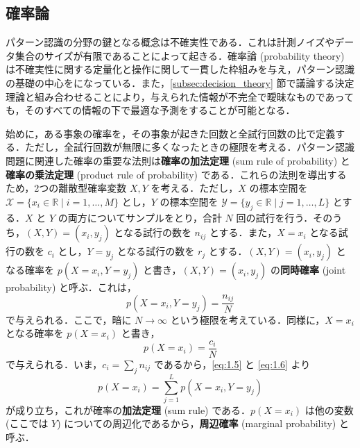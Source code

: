 \documentclass[uplatex,a4paper,oneside,openany,dvipdfmx]{jsarticle}
\numberwithin{equation}{section}
\theoremstyle{mystyle} %
\newcommand{\BR}{\mathbb{R}}
\newcommand{\CX}{\mathcal{X}}
\newcommand{\CY}{\mathcal{Y}}
\newcommand{\tb}[1]{\textbf{#1}}
\begin{document}
\subsection{確率論} \label{subsec:prob_theory}

パターン認識の分野の鍵となる概念は不確実性である．これは計測ノイズやデータ集合のサイズが有限であることによって起きる．確率論 (probability theory) は不確実性に関する定量化と操作に関して一貫した枠組みを与え，パターン認識の基礎の中心をになっている．また，\ref{subsec:decision_theory} 節で議論する決定理論と組み合わせることにより，与えられた情報が不完全で曖昧なものであっても，そのすべての情報の下で最適な予測をすることが可能となる．

始めに，ある事象の確率を，その事象が起きた回数と全試行回数の比で定義する．ただし，全試行回数が無限に多くなったときの極限を考える．パターン認識問題に関連した確率の重要な法則は\tb{確率の加法定理} (sum rule of probability) と\tb{確率の乗法定理} (product rule of probability) である．これらの法則を導出するため，2つの離散型確率変数 $X,Y$ を考える．ただし，$X$ の標本空間を $\CX = \{x_{i} \in \BR \mid i = 1,\ldots,M\}$ とし，$Y$ の標本空間を $\CY = \{y_{j} \in \BR \mid j = 1,\ldots,L\}$ とする．$X$ と $Y$ の両方についてサンプルをとり，合計 $N$ 回の試行を行う．そのうち，$(X,Y) = (x_{i},y_{j})$ となる試行の数を $n_{ij}$ とする．また，$X = x_{i}$ となる試行の数を $c_{i}$ とし，$Y = y_{j}$ となる試行の数を $r_{j}$ とする．$(X,Y) = (x_{i},y_{j})$ となる確率を $p(X=x_{i},Y=y_{j})$ と書き，$(X,Y) = (x_{i},y_{j})$ の\tb{同時確率} (joint probability) と呼ぶ．これは，
\begin{equation}  \label{eq:1.5}
    p(X=x_{i},Y=y_{j}) = \frac{n_{ij}}{N}
\end{equation}
で与えられる．ここで，暗に $N \rightarrow \infty$ という極限を考えている．同様に，$X=x_{i}$ となる確率を $p(X=x_{i})$ と書き，
\begin{equation} \label{eq:1.6}
    p(X=x_{i}) = \frac{c_{i}}{N}
\end{equation}
で与えられる．いま，$c_{i} = \sum_{j} n_{ij}$ であるから，\eqref{eq:1.5} と \eqref{eq:1.6} より
\begin{equation} \label{eq:1.7}
    p(X=x_{i}) = \sum_{j=1}^{L} p(X=x_{i},Y=y_{j})
\end{equation}
が成り立ち，これが確率の\tb{加法定理} (sum rule) である．$p(X=x_{i})$ は他の変数 (ここでは $Y$) についての周辺化であるから，\tb{周辺確率} (marginal probability) と呼ぶ．
\end{document}
